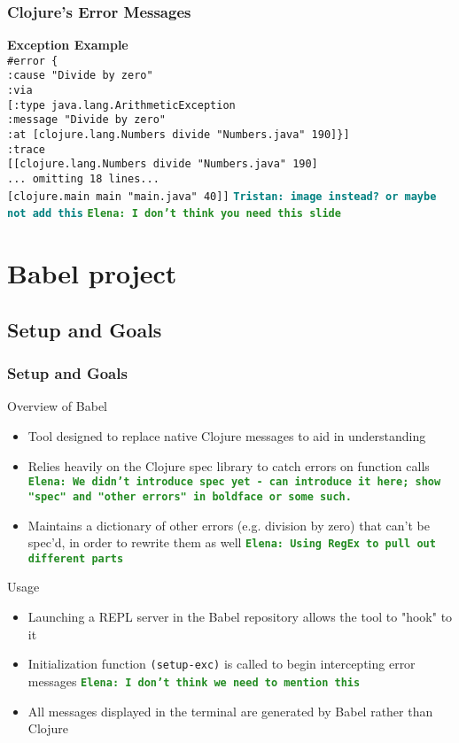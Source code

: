 \documentclass{beamer}
\newcommand{\comment}[1]{{\bf \tt  {#1}}}
\newcommand{\emcomment}[1]{\textcolor{ForestGreen}{\comment{Elena: {#1}}}}
\newcommand{\tkcomment}[1]{\textcolor{Teal}{\comment{Tristan: {#1}}}}
\begin{document}
\begin{frame}
  \frametitle{Clojure's Error Messages}
  \textbf{Exception Example} \\
  \texttt{\#error \{ } \\
  \texttt{:cause "Divide by zero"} \\
  \texttt{:via} \\
  \texttt{[{:type java.lang.ArithmeticException} } \\
  \texttt{:message "Divide by zero"} \\
  \texttt{:at [clojure.lang.Numbers divide "Numbers.java" 190]\}]} \\
  \texttt{:trace} \\
  \texttt{[[clojure.lang.Numbers divide "Numbers.java" 190]} \\
  \texttt{... omitting 18 lines...} \\
  \texttt{[clojure.main main "main.java" 40]]}
  \tkcomment{image instead? or maybe not add this}
\emcomment{I don't think you need this slide}
\end{frame}

\section{Babel project}

\subsection{Setup and Goals}
\begin{frame}
    \frametitle{Setup and Goals}
    Overview of Babel
    \begin{itemize}
        \item Tool designed to replace native Clojure messages to aid in understanding
        \item Relies heavily on the Clojure spec library to catch errors on function calls
\emcomment{We didn't introduce spec yet - can introduce it here; show "spec" and "other errors" in boldface or some such.}
        \item Maintains a dictionary of other errors (e.g. division by zero) that can't be spec'd, in order to rewrite them as well 
\emcomment{Using RegEx to pull out different parts}
    \end{itemize}
    Usage
    \begin{itemize}
        \item Launching a REPL server in the Babel repository allows the tool to "hook" to it
        \item Initialization function \texttt{(setup-exc)} is called to begin intercepting error messages
\emcomment{I don't think we need to mention this}
        \item All messages displayed in the terminal are generated by Babel rather than Clojure
    \end{itemize}
\end{frame}
\end{document}
